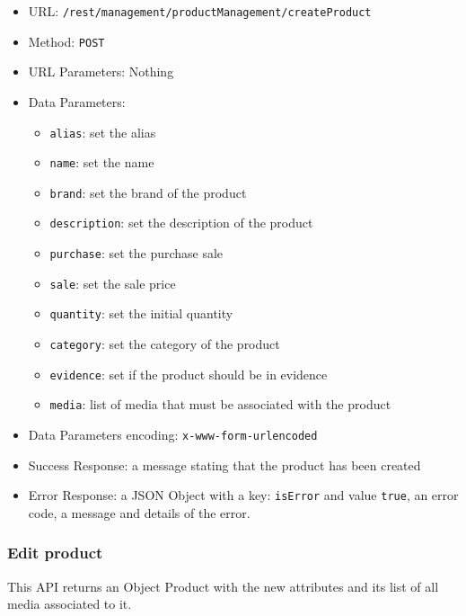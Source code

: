 \begin{itemize}
    \item URL: \texttt{/rest/management/productManagement/createProduct}
    \item Method: \texttt{POST}
    \item URL Parameters: Nothing
    \item Data Parameters: 
    \begin{itemize}
        \item \texttt{alias}: set the alias
        \item \texttt{name}: set the name
        \item \texttt{brand}: set the brand of the product
        \item \texttt{description}: set the description of the product
        \item \texttt{purchase}: set the purchase sale
        \item \texttt{sale}: set the sale price
        \item \texttt{quantity}: set the initial quantity
        \item \texttt{category}: set the category of the product
        \item \texttt{evidence}: set if the product should be in evidence
        \item \texttt{media}: list of media that must be associated with the product
    \end{itemize}
    \item Data Parameters encoding: \texttt{x-www-form-urlencoded}
    \item Success Response: a message stating that the product has been created
    \item Error Response: a JSON Object with a key: \texttt{isError}  and value \texttt{true}, an error code, a message and details of the error.
\end{itemize}


\subsubsection*{Edit product}
This API returns an Object Product with the new attributes and its list of all media associated to it.

